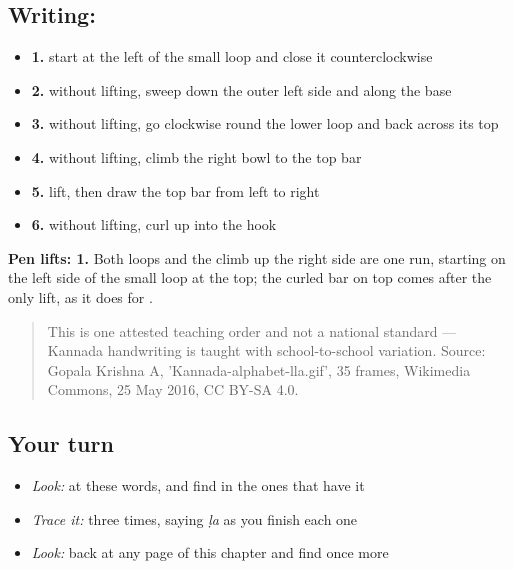 \subsection*{Writing: }

\begin{itemize}
\raggedright
  \item \textbf{1.} start at the left of the small loop and close it counterclockwise
  \item \textbf{2.} without lifting, sweep down the outer left side and along the base
  \item \textbf{3.} without lifting, go clockwise round the lower loop and back across its top
  \item \textbf{4.} without lifting, climb the right bowl to the top bar
  \item \textbf{5.} lift, then draw the top bar from left to right
  \item \textbf{6.} without lifting, curl up into the hook
\end{itemize}

\textbf{Pen lifts: 1.} Both loops and the climb up the right side are one run, starting on the left side of the small loop at the top; the curled bar on top comes after the only lift, as it does for .

\begin{quote}
This is one attested teaching order and not a national standard — Kannada handwriting is taught with school-to-school variation. Source: Gopala Krishna A, 'Kannada-alphabet-lla.gif', 35 frames, Wikimedia Commons, 25 May 2016, CC BY-SA 4.0.
\end{quote}

\subsection*{Your turn}
\begin{itemize}
\raggedright
  \item \emph{Look:} at these words, and find  in the ones that have it
\end{itemize}

\begin{quote}
\end{quote}

\begin{itemize}
\raggedright
  \item \emph{Trace it:}  three times, saying \emph{ḷa} as you finish each one
  \item \emph{Look:} back at any page of this chapter and find  once more
\end{itemize}

